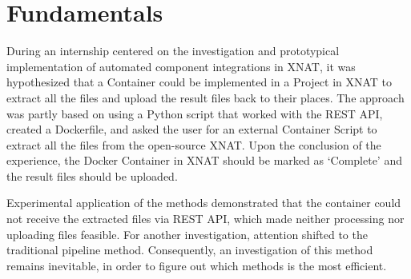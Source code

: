 


\section{Fundamentals}

During an internship centered on the investigation and prototypical implementation of automated component integrations in XNAT, it was hypothesized that a Container could be implemented in a Project in XNAT to extract all the files and upload the result files back to their places. The approach was partly based on using a Python script that worked with the REST API, created a Dockerfile, and asked the user for an external Container Script to extract all the files from the open-source XNAT. Upon the conclusion of the experience, the Docker Container in XNAT should be marked as ‘Complete’ and the result files should be uploaded. 

Experimental application of the methods demonstrated that the container could not receive the extracted files via REST API, which made neither processing nor uploading files feasible. For another investigation, attention shifted to the traditional pipeline method. Consequently, an investigation of this method remains inevitable, in order to figure out which methods is the most efficient.

  





